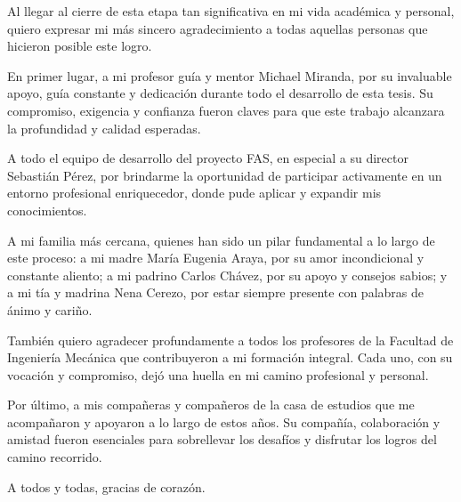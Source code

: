 Al llegar al cierre de esta etapa tan significativa en mi vida académica y personal, quiero expresar mi más sincero agradecimiento a todas aquellas personas que hicieron posible este logro.

En primer lugar, a mi profesor guía y mentor Michael Miranda, por su invaluable apoyo, guía constante y dedicación durante todo el desarrollo de esta tesis. Su compromiso, exigencia y confianza fueron claves para que este trabajo alcanzara la profundidad y calidad esperadas.

A todo el equipo de desarrollo del proyecto FAS, en especial a su director Sebastián Pérez, por brindarme la oportunidad de participar activamente en un entorno profesional enriquecedor, donde pude aplicar y expandir mis conocimientos.

A mi familia más cercana, quienes han sido un pilar fundamental a lo largo de este proceso: a mi madre María Eugenia Araya, por su amor incondicional y constante aliento; a mi padrino Carlos Chávez, por su apoyo y consejos sabios; y a mi tía y madrina Nena Cerezo, por estar siempre presente con palabras de ánimo y cariño.

También quiero agradecer profundamente a todos los profesores de la Facultad de Ingeniería Mecánica que contribuyeron a mi formación integral. Cada uno, con su vocación y compromiso, dejó una huella en mi camino profesional y personal.

Por último, a mis compañeras y compañeros de la casa de estudios que me acompañaron y apoyaron a lo largo de estos años. Su compañía, colaboración y amistad fueron esenciales para sobrellevar los desafíos y disfrutar los logros del camino recorrido.

A todos y todas, gracias de corazón.